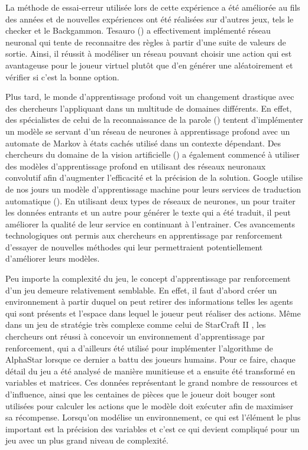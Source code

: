 \documentclass{article}
\begin{document}
La méthode de essai-erreur utilisée lors de cette expérience a été améliorée au fils des années et de nouvelles expériences ont été réalisées sur d'autres jeux, tels le checker et le	Backgammon. Tesauro (\cite{tesauro_sejnowski_1989}) a effectivement implémenté réseau neuronal qui tente de reconnaitre des règles à partir d'une suite de valeurs de sortie. Ainsi, il réussit à modéliser un réseau pouvant choisir une action qui est avantageuse pour le joueur virtuel plutôt que d'en générer une aléatoirement et vérifier si c'est la bonne option.
\linebreak

Plus tard, le monde d'apprentissage profond voit un changement drastique avec des chercheurs l'appliquant dans un multitude de domaines différents. En effet, des spécialistes de celui de la reconnaissance de la parole (\cite{dahl_yu_deng_acero_2012}) tentent d'implémenter un modèle se servant d'un réseau de neurones à apprentissage profond avec un  automate de Markov à états cachés utilisé dans un contexte dépendant. Des chercheurs du domaine de la vision artificielle (\cite{krizhevsky_sutskever_hinton_2017}) a également commencé à utiliser des modèles d'apprentissage profond en utilisant des réseaux neuronaux convolutif afin d'augmenter l'efficacité et la précision de la solution. Google utilise de nos jours un modèle d'apprentissage machine pour leurs services de traduction automatique (\cite{DBLP:journals/corr/WuSCLNMKCGMKSJL16}). En utilisant deux types de réseaux de neurones, un pour traiter les données entrants et un autre pour générer le texte qui a été traduit, il peut améliorer la qualité de leur service en continuant à l'entrainer. Ces avancements technologiques ont permis aux chercheurs en apprentissage par renforcement d'essayer de nouvelles méthodes qui leur permettraient potentiellement d'améliorer leurs modèles.
\linebreak

Peu importe la complexité du jeu, le concept d'apprentissage par renforcement d'un jeu demeure relativement semblable. En effet, il faut d'abord créer un environnement à partir duquel on peut retirer des informations telles les agents qui sont présents et l'espace dans lequel le joueur peut réaliser des actions. Même dans un jeu de stratégie très complexe comme celui de StarCraft II \cite{DBLP:journals/corr/abs-1708-04782}, les chercheurs ont réussi à concevoir un environnement d'apprentissage par renforcement, qui a d'ailleurs été utilisé pour implémenter l'algorithme de AlphaStar lorsque ce dernier a battu des joueurs humains. Pour ce faire, chaque détail du jeu a été analysé de manière munitieuse et a ensuite été transformé en variables et matrices. Ces données représentant le grand nombre de ressources et d'influence, ainsi que les centaines de pièces que le joueur doit bouger sont utilisées pour calculer les actions que le modèle doit exécuter afin de maximiser sa récompense. Lorsqu'on modélise un environnement, ce qui est l'élément le plus important est la précision des variables et c'est ce qui devient compliqué pour un jeu avec un plus grand niveau de complexité.
\linebreak
\end{document}
